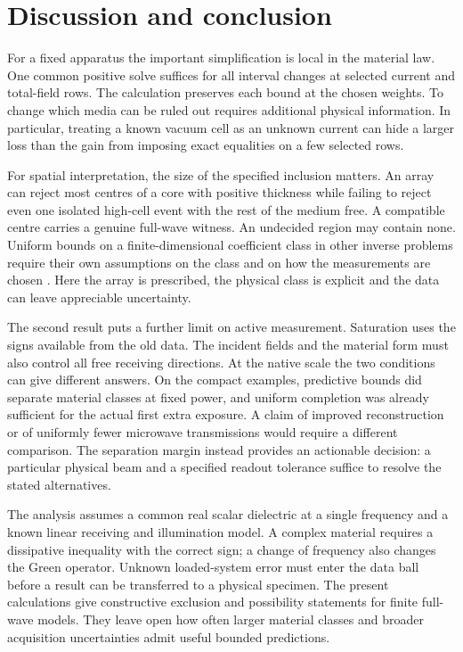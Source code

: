 \section{Discussion and conclusion}
For a fixed apparatus the important simplification is local in the material law. One common positive solve suffices for all interval changes at selected current and total-field rows. The calculation preserves each bound at the chosen weights. To change which media can be ruled out requires additional physical information. In particular, treating a known vacuum cell as an unknown current can hide a larger loss than the gain from imposing exact equalities on a few selected rows.

For spatial interpretation, the size of the specified inclusion matters. An array can reject most centres of a core with positive thickness while failing to reject even one isolated high-cell event with the rest of the medium free. A compatible centre carries a genuine full-wave witness. An undecided region may contain none. Uniform bounds on a finite-dimensional coefficient class in other inverse problems require their own assumptions on the class and on how the measurements are chosen \cite{alberti19,alberti21}. Here the array is prescribed, the physical class is explicit and the data can leave appreciable uncertainty.

The second result puts a further limit on active measurement. Saturation uses the signs available from the old data. The incident fields and the material form must also control all free receiving directions. At the native scale the two conditions can give different answers. On the compact examples, predictive bounds did separate material classes at fixed power, and uniform completion was already sufficient for the actual first extra exposure. A claim of improved reconstruction or of uniformly fewer microwave transmissions would require a different comparison. The separation margin instead provides an actionable decision: a particular physical beam and a specified readout tolerance suffice to resolve the stated alternatives.

The analysis assumes a common real scalar dielectric at a single frequency and a known linear receiving and illumination model. A complex material requires a dissipative inequality with the correct sign; a change of frequency also changes the Green operator. Unknown loaded-system error must enter the data ball before a result can be transferred to a physical specimen. The present calculations give constructive exclusion and possibility statements for finite full-wave models. They leave open how often larger material classes and broader acquisition uncertainties admit useful bounded predictions.

